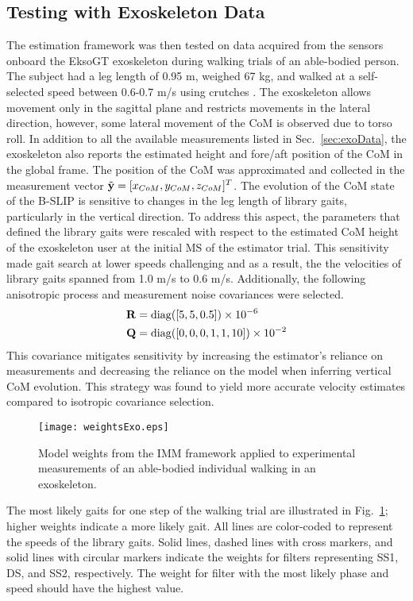 \subsection{Testing with Exoskeleton Data}

The estimation framework was then tested on data acquired from the sensors onboard the EksoGT exoskeleton during walking trials of an able-bodied person. The subject had a leg length of 0.95 m, weighed 67 kg, and walked at a self-selected speed between 0.6-0.7 m/s using crutches \cite{gambon2019characterizing}. The exoskeleton allows movement only in the sagittal plane and restricts movements in the lateral direction, however, some lateral movement of the CoM is observed due to torso roll. In addition to all the available measurements listed in Sec.~\ref{sec:exoData}, the exoskeleton also reports the estimated height and fore/aft position of the CoM in the global frame. The position of the CoM was approximated and collected in the measurement vector $ \tilde{\mathbf{y}} = [x_{CoM} ,y_{CoM} ,z_{CoM}]^T $. The evolution of the CoM state of the B-SLIP is sensitive to changes in the leg length of library gaits, particularly in the vertical direction. To address this aspect, the parameters that defined the library gaits were rescaled with respect to the estimated CoM height of the exoskeleton user at the initial MS of the estimator trial. This sensitivity made gait search at lower speeds challenging and as a result, the the velocities of library gaits spanned from 1.0 m/s to 0.6 m/s. Additionally, the following anisotropic process and measurement noise covariances were selected.
\begin{align}
		\mathbf{R} &= {\rm diag}([5,5,0.5])\times 10^{-6} \\
		\mathbf{Q} &={\rm diag}([0,0,0,1,1,10])\times 10^{-2}
\end{align}
This covariance mitigates sensitivity by increasing the estimator's reliance on measurements and decreasing the reliance on the model when inferring vertical CoM evolution. This strategy was found to yield more accurate velocity estimates compared to isotropic covariance selection. 

\begin{figure}
	\centering
	\texttt{[image: weightsExo.eps]}
	\caption{Model weights from the IMM framework applied to experimental measurements of an able-bodied individual walking in an exoskeleton.}\label{fig:exoWeights}
\end{figure}

The most likely gaits for one step of the walking trial are illustrated in Fig.~\ref{fig:exoWeights}; higher weights indicate a more likely gait. All lines are color-coded to represent the speeds of the library gaits. Solid lines, dashed lines with cross markers, and solid lines with circular markers indicate the weights for filters representing SS1, DS, and SS2, respectively. The weight for filter with the most likely phase and speed should have the highest value. 

